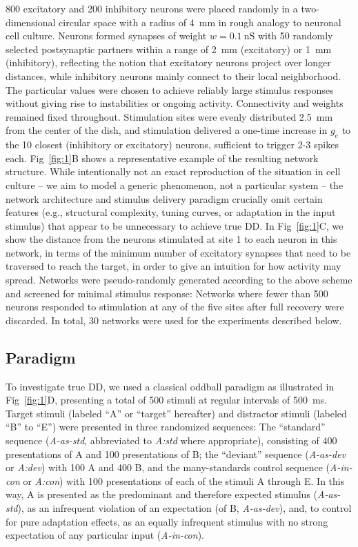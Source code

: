 \documentclass[10pt,letterpaper]{article}
\newcommand{\dev}{\textit{A-as-dev}}
\newcommand{\msc}{\textit{A-in-con}}
\newcommand{\std}{\textit{A-as-std}}
\newcommand{\FIG}[1]{Fig~\ref{fig:#1}}
\begin{document}
800 excitatory and 200 inhibitory neurons were placed randomly in a two-dimensional circular space with a radius of \qty{4}{\milli\meter} in rough analogy to neuronal cell culture. Neurons formed synapses of weight $w = \qty{0.1}{\nano\siemens}$ with 50 randomly selected postsynaptic partners within a range of \qty{2}{\milli\meter} (excitatory) or \qty{1}{\milli\meter} (inhibitory), reflecting the notion that excitatory neurons project over longer distances, while inhibitory neurons mainly connect to their local neighborhood. The particular values were chosen to achieve reliably large stimulus responses without giving rise to instabilities or ongoing activity. Connectivity and weights remained fixed throughout. Stimulation sites were evenly distributed \qty{2.5}{\milli\meter} from the center of the dish, and stimulation delivered a one-time increase in $g_e$ to the 10 closest (inhibitory or excitatory) neurons, sufficient to trigger 2-3 spikes each. \FIG{1}B shows a representative example of the resulting network structure. While intentionally not an exact reproduction of the situation in cell culture -- we aim to model a generic phenomenon, not a particular system -- the network architecture and stimulus delivery paradigm crucially omit certain features (e.g., structural complexity, tuning curves, or adaptation in the input stimulus) that appear to be unnecessary to achieve true DD. In \FIG{1}C, we show the distance from the neurons stimulated at site 1 to each neuron in this network, in terms of the minimum number of excitatory synapses that need to be traversed to reach the target, in order to give an intuition for how activity may spread. Networks were pseudo-randomly generated according to the above scheme and screened for minimal stimulus response: Networks where fewer than 500 neurons responded to stimulation at any of the five sites after full recovery were discarded. In total, 30 networks were used for the experiments described below.

\subsection*{Paradigm}

To investigate true DD, we used a classical oddball paradigm as illustrated in \FIG{1}D, presenting a total of 500 stimuli at regular intervals of \qty{500}{\milli\second}. Target stimuli (labeled ``A'' or ``target'' hereafter) and distractor stimuli (labeled ``B'' to ``E'') were presented in three randomized sequences: The ``standard'' sequence (\std{}, abbreviated to \textit{A:std} where appropriate), consisting of 400 presentations of A and 100 presentations of B; the ``deviant'' sequence (\dev{} or \textit{A:dev}) with 100 A and 400 B, and the many-standards control sequence (\msc{} or \textit{A:con}) with 100 presentations of each of the stimuli A through E. In this way, A is presented as the predominant and therefore expected stimulus (\std{}), as an infrequent violation of an expectation (of B, \dev{}), and, to control for pure adaptation effects, as an equally infrequent stimulus with no strong expectation of any particular input (\msc{}).
\end{document}
